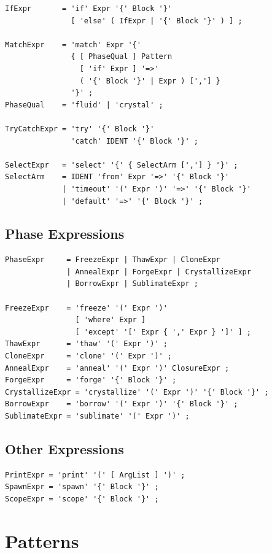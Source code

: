 \begin{lstlisting}[style=ebnf]
IfExpr       = 'if' Expr '{' Block '}'
               [ 'else' ( IfExpr | '{' Block '}' ) ] ;

MatchExpr    = 'match' Expr '{'
               { [ PhaseQual ] Pattern
                 [ 'if' Expr ] '=>'
                 ( '{' Block '}' | Expr ) [','] }
               '}' ;
PhaseQual    = 'fluid' | 'crystal' ;

TryCatchExpr = 'try' '{' Block '}'
               'catch' IDENT '{' Block '}' ;

SelectExpr   = 'select' '{' { SelectArm [','] } '}' ;
SelectArm    = IDENT 'from' Expr '=>' '{' Block '}'
             | 'timeout' '(' Expr ')' '=>' '{' Block '}'
             | 'default' '=>' '{' Block '}' ;
\end{lstlisting}

\subsection{Phase Expressions}

\begin{lstlisting}[style=ebnf]
PhaseExpr     = FreezeExpr | ThawExpr | CloneExpr
              | AnnealExpr | ForgeExpr | CrystallizeExpr
              | BorrowExpr | SublimateExpr ;

FreezeExpr    = 'freeze' '(' Expr ')'
                [ 'where' Expr ]
                [ 'except' '[' Expr { ',' Expr } ']' ] ;
ThawExpr      = 'thaw' '(' Expr ')' ;
CloneExpr     = 'clone' '(' Expr ')' ;
AnnealExpr    = 'anneal' '(' Expr ')' ClosureExpr ;
ForgeExpr     = 'forge' '{' Block '}' ;
CrystallizeExpr = 'crystallize' '(' Expr ')' '{' Block '}' ;
BorrowExpr    = 'borrow' '(' Expr ')' '{' Block '}' ;
SublimateExpr = 'sublimate' '(' Expr ')' ;
\end{lstlisting}

\subsection{Other Expressions}

\begin{lstlisting}[style=ebnf]
PrintExpr = 'print' '(' [ ArgList ] ')' ;
SpawnExpr = 'spawn' '{' Block '}' ;
ScopeExpr = 'scope' '{' Block '}' ;
\end{lstlisting}


\section{Patterns}

